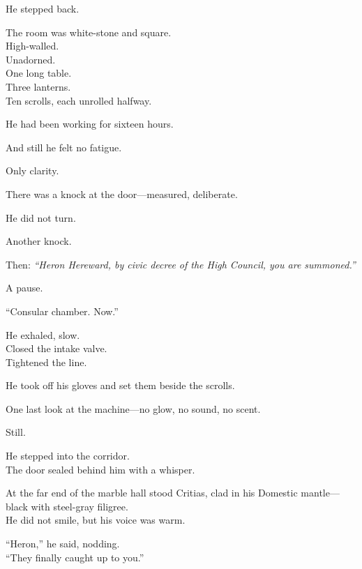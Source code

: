 \documentclass[12pt]{article}
\begin{document}
He stepped back.

\vspace{1em}

The room was white-stone and square.\\
High-walled.\\
Unadorned.\\
One long table.\\
Three lanterns.\\
Ten scrolls, each unrolled halfway.

He had been working for sixteen hours.

And still he felt no fatigue.

Only clarity.

\vspace{1em}

There was a knock at the door—measured, deliberate.

He did not turn.

Another knock.

Then: \textit{“Heron Hereward, by civic decree of the High Council, you are summoned.”}

A pause.

“Consular chamber. Now.”

\vspace{1em}

He exhaled, slow.\\
Closed the intake valve.\\
Tightened the line.

He took off his gloves and set them beside the scrolls.

One last look at the machine—no glow, no sound, no scent.

Still.

\vspace{1em}

He stepped into the corridor.\\
The door sealed behind him with a whisper.

\vspace{1em}

\noindent At the far end of the marble hall stood Critias, clad in his Domestic mantle—black with steel-gray filigree.\\
He did not smile, but his voice was warm.

\vspace{1em}

“Heron,” he said, nodding.\\
“They finally caught up to you.”
\end{document}
